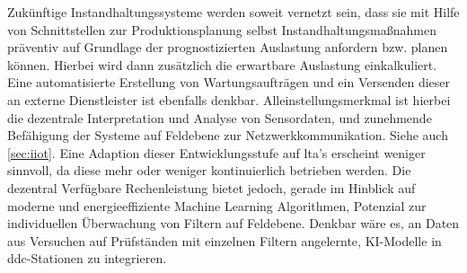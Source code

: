     Zukünftige Instandhaltungssysteme werden soweit vernetzt sein, dass sie mit Hilfe von Schnittstellen zur Produktionsplanung selbst Instandhaltungsmaßnahmen präventiv auf Grundlage der prognostizierten Auslastung anfordern bzw. planen können. Hierbei wird dann zusätzlich die erwartbare Auslastung einkalkuliert. Eine automatisierte Erstellung von Wartungsaufträgen und ein Versenden dieser an externe Dienstleister ist ebenfalls denkbar. Alleinstellungsmerkmal ist hierbei die dezentrale Interpretation und Analyse von Sensordaten, und zunehmende Befähigung der Systeme auf Feldebene zur Netzwerkkommunikation.  Siehe auch \ref{sec:iiot}. Eine Adaption dieser Entwicklungsstufe auf \ac{lta}'s erscheint weniger sinnvoll, da diese mehr oder weniger kontinuierlich betrieben werden. Die dezentral Verfügbare Rechenleistung bietet jedoch, gerade im Hinblick auf moderne und energieeffiziente Machine Learning Algorithmen, Potenzial zur individuellen Überwachung von Filtern auf Feldebene.
    Denkbar wäre es, an Daten aus Versuchen auf Prüfständen mit einzelnen Filtern angelernte, KI-Modelle in \ac{ddc}-Stationen zu integrieren.
